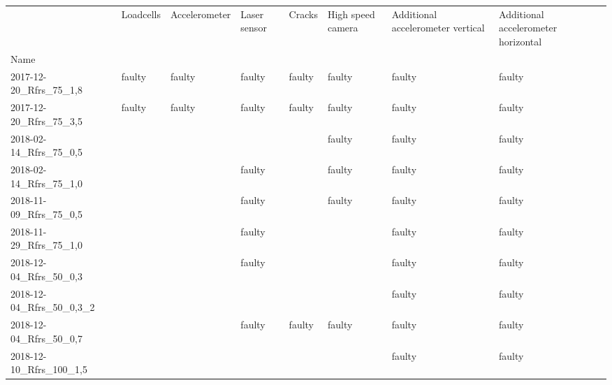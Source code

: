 \begin{tabular}{llllllp{2cm}p{2cm}}
\toprule
{} & Loadcells & Accelerometer & Laser sensor &  Cracks & High speed camera & Additional accelerometer vertical & Additional accelerometer horizontal \\
Name                          &           &               &              &         &                   &                                   &                                     \\
\midrule
2017-12-20\_Rfrs\_75\_1,8     &    faulty &        faulty &       faulty &  faulty &            faulty &                            faulty &                              faulty \\
2017-12-20\_Rfrs\_75\_3,5     &    faulty &        faulty &       faulty &  faulty &            faulty &                            faulty &                              faulty \\
2018-02-14\_Rfrs\_75\_0,5     &           &               &              &         &            faulty &                            faulty &                              faulty \\
2018-02-14\_Rfrs\_75\_1,0     &           &               &       faulty &         &            faulty &                            faulty &                              faulty \\
2018-11-09\_Rfrs\_75\_0,5     &           &               &       faulty &         &            faulty &                            faulty &                              faulty \\
2018-11-29\_Rfrs\_75\_1,0     &           &               &       faulty &         &                   &                            faulty &                              faulty \\
2018-12-04\_Rfrs\_50\_0,3     &           &               &       faulty &         &                   &                            faulty &                              faulty \\
2018-12-04\_Rfrs\_50\_0,3\_2  &           &               &              &         &                   &                            faulty &                              faulty \\
2018-12-04\_Rfrs\_50\_0,7     &           &               &       faulty &  faulty &            faulty &                            faulty &                              faulty \\
2018-12-10\_Rfrs\_100\_1,5    &           &               &              &         &                   &                            faulty &                              faulty \\

\end{tabular}
